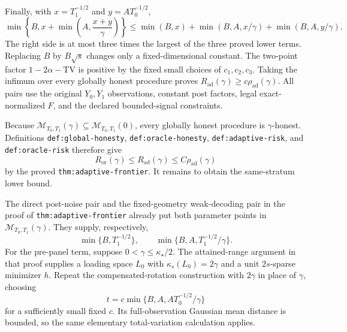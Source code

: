 Finally, with \(x=T_1^{-1/2}\) and \(y=AT_0^{-1/2}\),
\[
 \min\left\{B,x+\min\left(A,\frac{x+y}{\gamma}\right)\right\}
 \le \min(B,x)+\min(B,A,x/\gamma)+\min(B,A,y/\gamma).
\]
The right side is at most three times the largest of the three proved lower terms.  Replacing \(B\) by \(B\sqrt s\) changes only a fixed-dimensional constant.  The two-point factor \(1-2\alpha-\mathrm{TV}\) is positive by the fixed small choices of \(c_1,c_2,c_3\).  Taking the infimum over every globally honest procedure proves \(R_{\mathrm{ad}}(\gamma)\ge c\rho_{\mathrm{ad}}(\gamma)\).  All pairs use the original \(Y_0,Y_1\) observations, constant post factors, legal exact-normalized \(F\), and the declared bounded-signal constraints.

Because \(\mathcal M_{T_0,T_1}(\gamma)\subseteq\mathcal M_{T_0,T_1}(0)\), every globally honest procedure is \(\gamma\)-honest.  Definitions \texttt{def:global-honesty}, \texttt{def:oracle-honesty}, \texttt{def:adaptive-risk}, and \texttt{def:oracle-risk} therefore give
\[
 R_{\mathrm{or}}(\gamma)\le R_{\mathrm{ad}}(\gamma)
 \le C\rho_{\mathrm{ad}}(\gamma)
\]
by the proved \texttt{thm:adaptive-frontier}.  It remains to obtain the same-stratum lower bound.

The direct post-noise pair and the fixed-geometry weak-decoding pair in the proof of \texttt{thm:adaptive-frontier} already put both parameter points in \(\mathcal M_{T_0,T_1}(\gamma)\).  They supply, respectively,
\[
 \min\{B,T_1^{-1/2}\},
 \qquad
 \min\{B,A,T_1^{-1/2}/\gamma\}.
\]
For the pre-panel term, suppose \(0<\gamma\le\kappa_\star/2\).  The attained-range argument in that proof supplies a loading space \(L_0\) with \(\kappa_s(L_0)=2\gamma\) and a unit \(2s\)-sparse minimizer \(h\).  Repeat the compensated-rotation construction with \(2\gamma\) in place of \(\gamma\), choosing
\[
 t=c\min\{B,A,AT_0^{-1/2}/\gamma\}
\]
for a sufficiently small fixed \(c\).  Its full-observation Gaussian mean distance is bounded, so the same elementary total-variation calculation applies.

